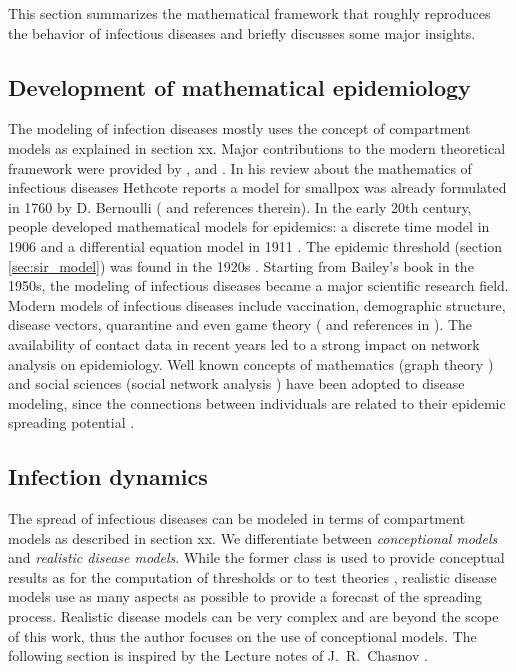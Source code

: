 \documentclass[openright,twoside,headsepline]{scrbook}
\begin{document}
This section summarizes the mathematical framework that roughly reproduces the behavior of infectious diseases and briefly discusses some major insights.


\subsection{Development of mathematical epidemiology}
The modeling of infection diseases mostly uses the concept of compartment models as explained in section xx.
Major contributions to the modern theoretical framework were provided by \cite{kermack:27}, \cite{bailey:57} and \cite{andersonmay:92}.
In his review about the mathematics of infectious diseases Hethcote reports a model for smallpox was already formulated in 1760 by D. Bernoulli (\cite{Hethcote:2000} and references therein).
In the early 20th century, people developed mathematical models for epidemics: a discrete time model in 1906 \cite{Hamer} and a differential equation model in 1911 \cite{Ross}.
The epidemic threshold (section \ref{sec:sir_model}) was found in the 1920s \cite{kermack:1927_thresh} \cite{kermack:27}.
Starting from Bailey's book \cite{bailey:57} in the 1950s, the modeling of infectious diseases became a major scientific research field.
Modern models of infectious diseases include vaccination, demographic structure, disease vectors, quarantine and even game theory (\cite{Bauch:2004} and references in \cite{Hethcote:2000}).
The availability of contact data in recent years led to a strong impact on network analysis on epidemiology.
Well known concepts of mathematics (graph theory \cite{Bollobas:1985}) and social sciences (social network analysis \cite{WassermanFaust}) have been adopted to disease modeling, since the connections between individuals are related to their epidemic spreading potential \cite{Keeling:2005}.

\subsection{Infection dynamics}

The spread of infectious diseases can be modeled in terms of compartment models as described in section xx.
We differentiate between \emph{conceptional models} and \emph{realistic disease models}.
While the former class is used to provide conceptual results as for the computation of thresholds or to test theories \cite{Hethcote:2000}, realistic disease models use as many aspects as possible to provide a forecast of the spreading process.
Realistic disease models can be very complex and are beyond the scope of this work, thus the author focuses on the use of conceptional models.
The following section is inspired by the Lecture notes of J.~R.~Chasnov \cite{Chasnov:2010}.
\end{document}
